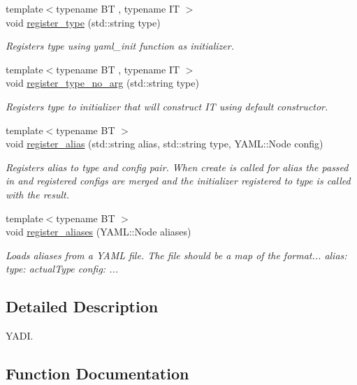 \begin{DoxyCompactItemize}
$$\item 
{\footnotesize template$<$typename BT , typename IT $>$ }\\void \hyperlink{namespaceyadi_a5041a043acc0144113854035fb8beb2a}{register\+\_\+type} (std\+::string type)
\begin{DoxyCompactList}\small\item\em Registers type using yaml\+\_\+init function as initializer. \end{DoxyCompactList}\item 
{\footnotesize template$<$typename BT , typename IT $>$ }\\void \hyperlink{namespaceyadi_ad2b26848cc9dc3459c264cc734308204}{register\+\_\+type\+\_\+no\+\_\+arg} (std\+::string type)
\begin{DoxyCompactList}\small\item\em Registers type to initializer that will construct IT using default constructor. \end{DoxyCompactList}\item 
{\footnotesize template$<$typename BT $>$ }\\void \hyperlink{namespaceyadi_a5f8e048a8bef5792a7c5b3aae435999d}{register\+\_\+alias} (std\+::string alias, std\+::string type, Y\+A\+M\+L\+::\+Node config)
\begin{DoxyCompactList}\small\item\em Registers alias to type and config pair. When create is called for alias the passed in and registered configs are merged and the initializer registered to type is called with the result. \end{DoxyCompactList}\item 
{\footnotesize template$<$typename BT $>$ }\\void \hyperlink{namespaceyadi_a0879baf3dca6ee9a7d4387bfca43f8dd}{register\+\_\+aliases} (Y\+A\+M\+L\+::\+Node aliases)
\begin{DoxyCompactList}\small\item\em Loads aliases from a Y\+A\+ML file. The file should be a map of the format... alias\+: type\+: actual\+Type config\+: ... \end{DoxyCompactList}\end{DoxyCompactItemize}


\subsection{Detailed Description}
Y\+A\+DI. 

\subsection{Function Documentation}
\mbox{\label{namespaceyadi_ac39d8f532bdf81e833cb117160a6440a}} 
